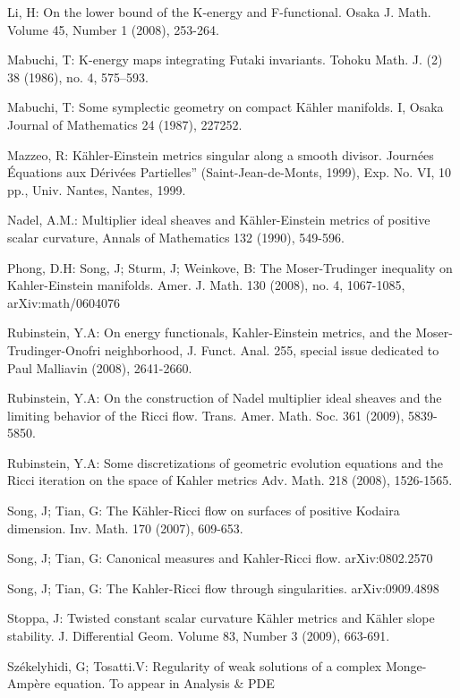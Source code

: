 \documentclass[11pt,oneside,english]{amsart}
\numberwithin{equation}{section}
\numberwithin{figure}{section}
\theoremstyle{plain}
\theoremstyle{plain}
\theoremstyle{plain}
\theoremstyle{plain}
\theoremstyle{remark}
\theoremstyle{definition}
\begin{document}
\begin{thebibliography}{10}
Li, H: On the lower bound of the K-energy and F-functional.
Osaka J. Math. Volume 45, Number 1 (2008), 253-264.

Mabuchi, T: K-energy maps integrating Futaki invariants.
Tohoku Math. J. (2) 38 (1986), no. 4, 575--593.

Mabuchi, T: Some symplectic geometry on compact Kähler
manifolds. I, Osaka Journal of Mathematics 24 (1987), 227\textendash{}252.

Mazzeo, R: Kähler-Einstein metrics singular along a smooth
divisor. Journées \textquotedbl{}Équations aux Dérivées Partielles''
(Saint-Jean-de-Monts, 1999), Exp. No. VI, 10 pp., Univ. Nantes, Nantes,
1999.

Nadel, A.M.: Multiplier ideal sheaves and Kähler-Einstein
metrics of positive scalar curvature, Annals of Mathematics 132 (1990),
549-596.

Phong, D.H: Song, J; Sturm, J; Weinkove, B: The Moser-Trudinger
inequality on Kahler-Einstein manifolds. Amer. J. Math. 130 (2008),
no. 4, 1067-1085, arXiv:math/0604076

Rubinstein, Y.A: On energy functionals, Kahler-Einstein
metrics, and the Moser-Trudinger-Onofri neighborhood, J. Funct. Anal.
255, special issue dedicated to Paul Malliavin (2008), 2641-2660.

Rubinstein, Y.A: On the construction of Nadel multiplier
ideal sheaves and the limiting behavior of the Ricci flow. Trans.
Amer. Math. Soc. 361 (2009), 5839-5850.

Rubinstein, Y.A: Some discretizations of geometric
evolution equations and the Ricci iteration on the space of Kahler
metrics Adv. Math. 218 (2008), 1526-1565.

Song, J; Tian, G: The Kähler-Ricci flow on surfaces
of positive Kodaira dimension. Inv. Math. 170 (2007), 609-653.

Song, J; Tian, G: Canonical measures and Kahler-Ricci
flow. arXiv:0802.2570

Song, J; Tian, G: The Kahler-Ricci flow through singularities.
arXiv:0909.4898

Stoppa, J: Twisted constant scalar curvature Kähler metrics
and Kähler slope stability. J. Differential Geom. Volume 83, Number
3 (2009), 663-691.

Székelyhidi, G; Tosatti.V: Regularity of weak solutions
of a complex Monge-Ampère equation. To appear in Analysis \& PDE


\end{thebibliography}
\end{document}
